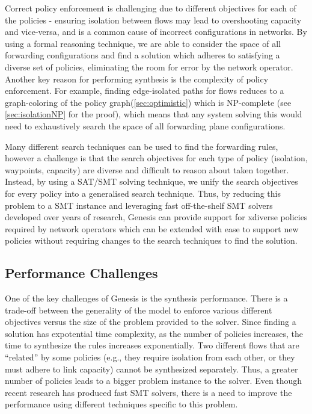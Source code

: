 Correct policy enforcement is challenging due to different objectives
for each of the policies - ensuring isolation between flows may lead
to overshooting capacity and vice-versa, and is a common cause of
incorrect configurations in networks. By using a formal reasoning
technique, we are able to consider the space of all forwarding
configurations and find a solution which adheres to satisfying a
diverse set of policies, eliminating the room for error by the network
operator. Another key reason for performing synthesis is the
complexity of policy enforcement. For example, finding edge-isolated
paths  for flows reduces to a
graph-coloring of the policy graph(\cref{sec:optimistic}) which is
NP-complete (see \cref{sec:isolationNP} for the proof), which means
that any system solving this would need to exhaustively search the
space of all forwarding plane configurations.

Many different search techniques can be used to find the forwarding
rules, however a challenge is that the search objectives for each type
of policy (isolation, waypoints, capacity) are diverse and difficult
to reason about taken together. Instead, by using a SAT/SMT solving
technique, we unify the search objectives for every policy into a
generalised search technique. Thus, by reducing this problem to a SMT
instance and leveraging fast off-the-shelf SMT solvers developed over
years of research, Genesis can provide support for xdiverse policies
required by network operators which can be extended with ease to
support new policies without requiring changes to the search
techniques to find the solution.

\subsection{Performance Challenges} \label{sec:performance}

One of the key challenges of Genesis is the synthesis
performance. There is a trade-off between the generality of the model
to enforce various different objectives versus the size of the problem
provided to the solver.  Since finding a solution has expotential time
complexity, as the number of policies increases, the time to
synthesize the rules increases exponentially. Two different flows that
are ``related'' by some policies (e.g., they require isolation from
each other, or they must adhere to link capacity) cannot be
synthesized separately.  Thus, a greater number of policies leads to a
bigger problem instance to the solver. Even though recent research has
produced fast SMT solvers, there is a need to improve the performance
using different techniques specific to this problem.

